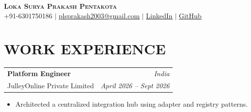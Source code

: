 \documentclass[10pt,a4paper]{article}
\makeatletter
\newcommand{\resumeItem}[1]{\item\small{{#1 \vspace{-2pt}}}}
\newcommand{\resumeSubheading}[4]{
  \vspace{4pt}\nopagebreak[3]
  \begin{tabular*}{1.0\textwidth}[t]{l@{\extracolsep{\fill}}r}
    \textbf{#1} & \textit{\small #2} \\[-1pt]
    {\small #3} & \textit{\small #4}
  \end{tabular*}\vspace{1.5pt}\nopagebreak[4]
}
\newcommand{\resumeSubHeadingListStart}{}
\newcommand{\resumeSubHeadingListEnd}{}
\newcommand{\resumeItemListStart}{\begin{itemize}[leftmargin=1.2em, itemsep=1pt, parsep=0pt, topsep=1pt, partopsep=0pt, label=\textbullet]}
\newcommand{\resumeItemListEnd}{\end{itemize}}
\makeatother
\begin{document}
\pagestyle{empty}
\thispagestyle{empty}
\begin{center}\textbf{\Huge \scshape Loka Surya Prakash Pentakota} \\ \vspace{1pt}\small +91-6301750186 $|$ \href{mailto:plsprakash2003@gmail.com}{\underline{plsprakash2003@gmail.com}} $|$ \href{https://linkedin.com/in/surya}{\underline{LinkedIn}} $|$ \href{https://github.com/surya}{\underline{GitHub}}\end{center}
\section{WORK EXPERIENCE}
\resumeSubHeadingListStart
\resumeSubheading{Platform Engineer}{India}{JulleyOnline Private Limited}{April 2026 -- Sept 2026}
\resumeItemListStart
\resumeItem{Architected a centralized integration hub using adapter and registry patterns.}
\resumeItemListEnd
\resumeSubHeadingListEnd
\end{document}
